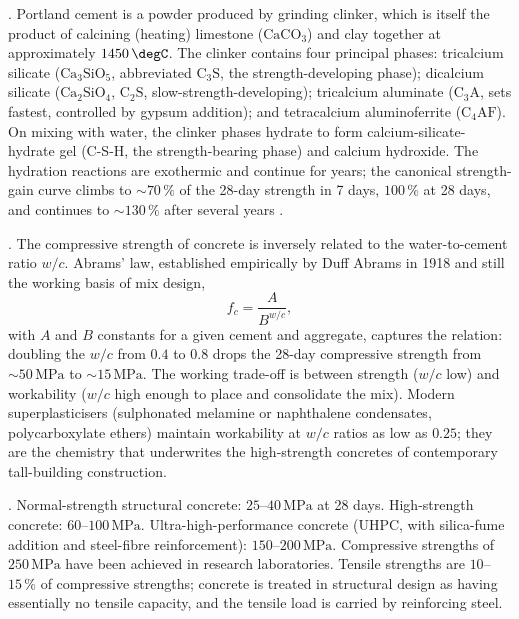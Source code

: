 . Portland cement is a powder
produced by grinding clinker, which is itself the product of
calcining (heating) limestone ($\mathrm{CaCO_3}$) and clay together at
approximately $1450\,\degC$. The clinker contains four principal
phases: tricalcium silicate ($\mathrm{Ca_3SiO_5}$, abbreviated
$\mathrm{C_3S}$, the strength-developing phase); dicalcium silicate
($\mathrm{Ca_2SiO_4}$, $\mathrm{C_2S}$, slow-strength-developing);
tricalcium aluminate ($\mathrm{C_3A}$, sets fastest, controlled by
gypsum addition); and tetracalcium aluminoferrite
($\mathrm{C_4AF}$). On mixing with water, the clinker phases hydrate
to form calcium-silicate-hydrate gel (C-S-H, the strength-bearing
phase) and calcium hydroxide. The hydration reactions are exothermic
and continue for years; the canonical strength-gain curve climbs to
$\sim 70\,\%$ of the 28-day strength in 7 days, $100\,\%$ at 28 days,
and continues to $\sim 130\,\%$ after several years \cite[ch.~4]{
text:neville-concrete}.

. The compressive strength of
concrete is inversely related to the water-to-cement ratio
$w/c$. Abrams' law, established empirically by Duff Abrams in 1918
and still the working basis of mix design,
\[
f_c = \frac{A}{B^{w/c}},
\]
with $A$ and $B$ constants for a given cement and aggregate, captures
the relation: doubling the $w/c$ from $0.4$ to $0.8$ drops the
28-day compressive strength from $\sim 50\,\text{MPa}$ to
$\sim 15\,\text{MPa}$. The working trade-off is between strength
($w/c$ low) and workability ($w/c$ high enough to place and consolidate
the mix). Modern superplasticisers (sulphonated melamine or
naphthalene condensates, polycarboxylate ethers) maintain workability
at $w/c$ ratios as low as $0.25$; they are the chemistry that
underwrites the high-strength concretes of contemporary tall-building
construction.

. Normal-strength structural
concrete: $25$--$40\,\text{MPa}$ at 28 days. High-strength concrete:
$60$--$100\,\text{MPa}$. Ultra-high-performance concrete (UHPC, with
silica-fume addition and steel-fibre reinforcement): $150$--$200\,
\text{MPa}$. Compressive strengths of $250\,\text{MPa}$ have been
achieved in research laboratories. Tensile strengths are
$10$--$15\,\%$ of compressive strengths; concrete is treated in
structural design as having essentially no tensile capacity, and the
tensile load is carried by reinforcing steel.

